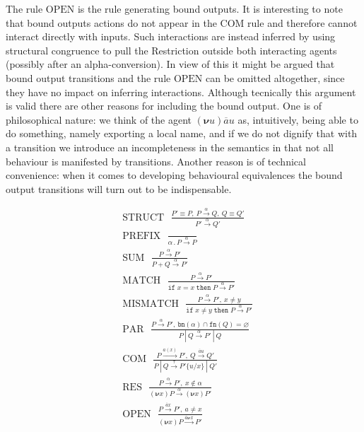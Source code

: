 \documentclass[10pt,a4paper]{article}
\newcommand{\ifthen}[2]{\texttt{if}\;#1\;\texttt{then}\;#2}
\newcommand{\resp}[1]{(\boldsymbol{\nu}#1)}
\newcommand{\res}[2]{\resp{#1}#2}
\newcommand{\outp}[2]{\overline{#1}#2}
\newcommand{\inpp}[2]{#1(#2)}
\newcommand{\silp}{\tau}
\newcommand{\prefix}[2]{{#1}\,.\,#2}
\newcommand{\boutp}[2]{\overline{#1}\boldsymbol{\nu}#2}
\newcommand{\para}{\:|\:}
\newcommand{\fn}{\texttt{fn}}
\newcommand{\bn}{\texttt{bn}}
\newcommand{\tran}[3]{#1 \overset{#2}{\longrightarrow} #3}
\newcommand{\rulname}[1]{\scriptstyle \text{#1}}
\newcommand{\rul}[3]{\rulname{#1} \:\:\: \displaystyle \frac{#2}{#3}}
\begin{document}
The rule $\rulname{OPEN}$ is the rule generating bound outputs. It is interesting to note that bound outputs actions do not appear in the $\rulname{COM}$ rule and therefore cannot interact directly with inputs. Such interactions are instead inferred by using structural congruence to pull the Restriction outside both interacting agents (possibly after an alpha-conversion). In view of this it might be argued that bound output transitions and the rule $\rulname{OPEN}$ can be omitted altogether, since they have no impact on inferring interactions. Although tecnically this argument is valid there are other reasons for including the bound output. One is of philosophical nature: we think of the agent $\res{u}{\outp{a}{u}}$ as, intuitively, being able to do something, namely exporting a local name, and if we do not dignify that with a transition we introduce an incompleteness in the semantics in that not all behaviour is manifested by transitions. Another reason is of technical convenience: when it comes to developing behavioural equivalences the bound output transitions will turn out to be indispensable.

\begin{framed}
  \begin{align*}
    &\rul{STRUCT}{P' \equiv P, \: \tran{P}{\alpha}{Q}, \: Q \equiv Q'}{\tran{P'}{\alpha}{Q'}} \\[2.0ex]
    &\rul{PREFIX}{}{\tran{\prefix{\alpha}{P}}{\alpha}{P}} \\[2.0ex]
    &\rul{SUM}{\tran{P}{\alpha}{P'}}{\tran{P + Q}{\alpha}{P'}} \\[2.0ex]
    &\rul{MATCH}{\tran{P}{\alpha}{P'}}{\tran{\ifthen{x = x}{P}}{\alpha}{P'}} \\[2.0ex]
    &\rul{MISMATCH}{\tran{P}{\alpha}{P'}, \: x \neq y}{\tran{\ifthen{x \neq y}{P}}{\alpha}{P'}} \\[2.0ex]
    &\rul{PAR}{\tran{P}{\alpha}{P'}, \: \bn(\alpha) \cap \fn(Q) = \varnothing}{\tran{P \para Q}{\alpha}{P' \para Q}} \\[2.0ex]
    &\rul{COM}{\tran{P}{\inpp{a}{x}}{P'}, \: \tran{Q}{\outp{a}{u}}{Q'}}{\tran{P \para Q}{\silp}{P'\{u/x\} \para Q'}} \\[2.0ex]
    &\rul{RES}{\tran{P}{\alpha}{P'}, \: x \notin \alpha}{\tran{\res{x}{P}}{\alpha}{\res{x}{P'}}} \\[2.0ex]
    &\rul{OPEN}{\tran{P}{\outp{a}{x}}{P'}, \: a \neq x}{\tran{\res{x}{P}}{\boutp{a}{x}}{P'}}
  \end{align*}
\end{framed}
\end{document}
